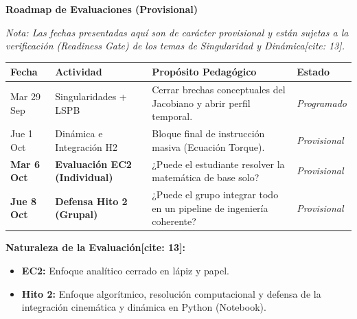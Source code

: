 \documentclass[11pt, a4paper]{article}
\begin{document}
\begin{center}
    \Large\textbf{\textcolor{ucbblue}{Roadmap de Evaluaciones (Provisional)}}\\[0.2cm]
\end{center}

\textit{Nota: Las fechas presentadas aquí son de carácter provisional y están sujetas a la verificación (Readiness Gate) de los temas de Singularidad y Dinámica[cite: 13].}

\vspace{0.4cm}
\renewcommand{\arraystretch}{1.5}
\begin{tabularx}{\textwidth}{|l|l|X|l|}
\hline
\rowcolor{ucbblue!20} \textbf{Fecha} & \textbf{Actividad} & \textbf{Propósito Pedagógico} & \textbf{Estado} \\ \hline
Mar 29 Sep & Singularidades + LSPB & Cerrar brechas conceptuales del Jacobiano y abrir perfil temporal. & \textit{Programado} \\ \hline
Jue 1 Oct & Dinámica e Integración H2 & Bloque final de instrucción masiva (Ecuación Torque). & \textit{Provisional} \\ \hline
\textbf{Mar 6 Oct} & \textbf{Evaluación EC2 (Individual)} & ¿Puede el estudiante resolver la matemática de base solo? & \textit{Provisional} \\ \hline
\textbf{Jue 8 Oct} & \textbf{Defensa Hito 2 (Grupal)} & ¿Puede el grupo integrar todo en un pipeline de ingeniería coherente? & \textit{Provisional} \\ \hline
\end{tabularx}

\vspace{0.8cm}
\textbf{Naturaleza de la Evaluación[cite: 13]:}
\begin{itemize}
    \item \textbf{EC2:} Enfoque analítico cerrado en lápiz y papel.
    \item \textbf{Hito 2:} Enfoque algorítmico, resolución computacional y defensa de la integración cinemática y dinámica en Python (Notebook).
\end{itemize}
\end{document}
